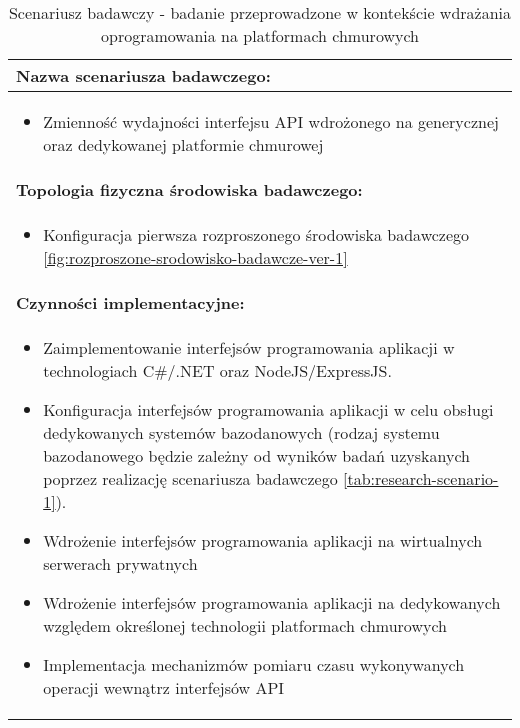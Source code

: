 \setlength{\LTcapwidth}{\textwidth}
\setlength\LTleft{0pt}
\setlength\LTright{0pt}
\begin{longtable}[c]{|llll|}
    \caption{Scenariusz badawczy - badanie przeprowadzone w kontekście wdrażania oprogramowania na platformach chmurowych}
    \label{tab:research-scenario-5}                                                  \\ \hline
    \multicolumn{4}{|l|}{\textbf{Nazwa scenariusza badawczego:}}                     \\ \hline
    \multicolumn{4}{|p{\linewidth}|}{
        \begin{itemize}[label={}]
            \item Zmienność wydajności interfejsu API wdrożonego na generycznej oraz dedykowanej platformie chmurowej
          \end{itemize}
    } \\ \hline
    \multicolumn{4}{|l|}{\textbf{Topologia fizyczna środowiska badawczego:}}         \\ \hline
    \multicolumn{4}{|p{\linewidth}|}{
        \begin{itemize}[label={}]
            \item Konfiguracja pierwsza rozproszonego środowiska badawczego \ref{fig:rozproszone-srodowisko-badawcze-ver-1}
          \end{itemize}
    }\\ \hline
    \multicolumn{4}{|l|}{\textbf{Czynności implementacyjne:}}                        \\ \hline
    \multicolumn{4}{|p{\linewidth}|}{
        \begin{itemize}
            \item Zaimplementowanie interfejsów programowania aplikacji w technologiach C\#/.NET oraz NodeJS/ExpressJS.
            \item Konfiguracja interfejsów programowania aplikacji w celu obsługi dedykowanych systemów bazodanowych (rodzaj systemu bazodanowego będzie zależny od wyników badań uzyskanych poprzez realizację scenariusza badawczego \ref{tab:research-scenario-1}).
            \item Wdrożenie interfejsów programowania aplikacji na wirtualnych serwerach prywatnych
            \item Wdrożenie interfejsów programowania aplikacji na dedykowanych względem określonej technologii platformach chmurowych
            \item Implementacja mechanizmów pomiaru czasu wykonywanych operacji wewnątrz interfejsów API

\end{itemize}}
\end{longtable}

